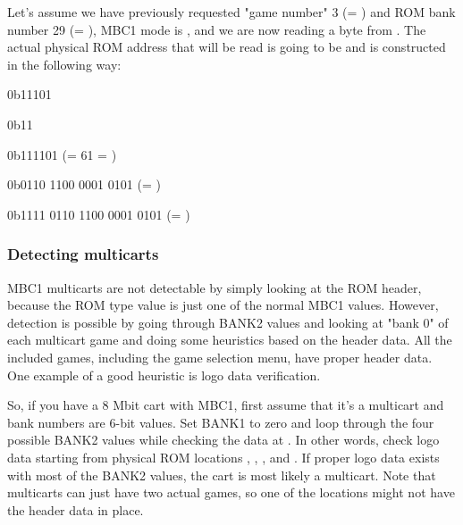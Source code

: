 Let's assume we have previously requested "game number" 3 (= )
and ROM bank number 29 (= ), MBC1 mode is , and we are
now reading a byte from . The actual physical ROM address that
will be read is going to be  and is constructed in the
following way:

\begin{description}[leftmargin=15em,style=nextline]
  \item[Value of the BANK1 register]
  {
    \ttfamily
    0b\colorbox{gray!10}{1}\colorbox{blue!30}{1101}
  }
  \item[Value of the BANK2 register]
  {
    \ttfamily
    0b\colorbox{red!30}{11}
  }
  \item[ROM bank number]
  {
    \ttfamily
    0b\colorbox{red!30}{11}\colorbox{blue!30}{1101} (= 61 = )
  }
  \item[Address being read]
  {
    \ttfamily
    0b\colorbox{gray!10}{01}\colorbox{green!30}{10 1100 0001 0101} (= )
  }
  \item[Actual physical ROM address]
  {
    \ttfamily
    0b\colorbox{red!30}{11}\colorbox{blue!30}{11 01}\colorbox{green!30}{10 1100 0001 0101} (= )
  }
\end{description}

\subsubsection{Detecting multicarts}

MBC1 multicarts are not detectable by simply looking at the ROM header, because
the ROM type value is just one of the normal MBC1 values. However, detection is
possible by going through BANK2 values and looking at "bank 0" of each
multicart game and doing some heuristics based on the header data. All the
included games, including the game selection menu, have proper header data.
One example of a good heuristic is logo data verification.

So, if you have a 8 Mbit cart with MBC1, first assume that it's a multicart and
bank numbers are 6-bit values. Set BANK1 to zero and loop through the four
possible BANK2 values while checking the data at . In
other words, check logo data starting from physical ROM locations ,
, , and . If proper logo data exists with most
of the BANK2 values, the cart is most likely a multicart. Note that multicarts
can just have two actual games, so one of the locations might not have the
header data in place.

